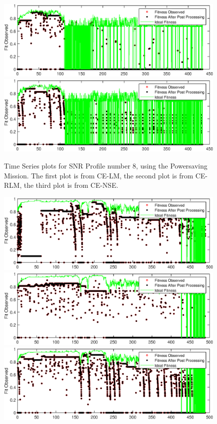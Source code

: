 \begin{appendices}
\begin{figure}[ht!]
\includegraphics{figures/c_sim_timeSeries/Fitness_timeSeries_RLM_8.eps}
\includegraphics{figures/c_sim_timeSeries/Fitness_timeSeries_NSE_8.eps}
\caption{Time Series plots for SNR Profile number 8, using the Powersaving Mission. The first plot is from CE-LM, the second plot is from CE-RLM, the third plot is from CE-NSE.}
\end{figure}
\begin{figure}[ht!]
\includegraphics{figures/c_sim_timeSeries/Fitness_timeSeries_LM_9.eps}
\includegraphics{figures/c_sim_timeSeries/Fitness_timeSeries_RLM_9.eps}
\includegraphics{figures/c_sim_timeSeries/Fitness_timeSeries_NSE_9.eps}

\end{figure}
\end{appendices}
